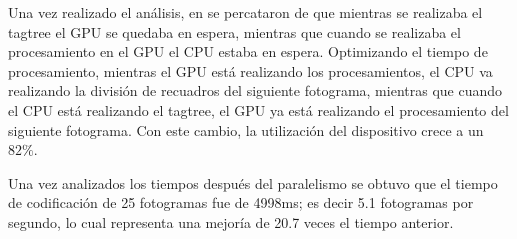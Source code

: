 \documentclass{article}
\begin{document}
Una vez realizado el análisis, en \cite{articulo} se percataron de que mientras se realizaba el tagtree el GPU se quedaba en espera, mientras que cuando se realizaba el procesamiento en el GPU el CPU estaba en espera. Optimizando el tiempo de procesamiento, mientras el GPU está realizando los procesamientos, el CPU va realizando la división de recuadros del siguiente fotograma, mientras que cuando el CPU está realizando el tagtree, el GPU ya está realizando el procesamiento del siguiente fotograma.  Con este cambio, la utilización del dispositivo crece a un $82\%$.

Una vez analizados los tiempos después del paralelismo se obtuvo que el tiempo de codificación de 25 fotogramas fue de 4998ms; es decir 5.1 fotogramas por segundo, lo cual representa una mejoría de 20.7 veces el tiempo anterior.




\end{document}
